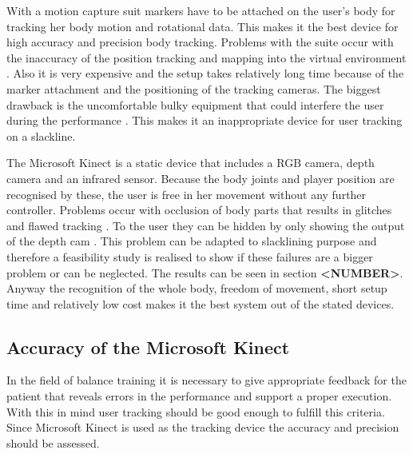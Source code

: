 With a motion capture suit markers have to be attached on the user’s body for tracking her body motion and rotational data. This makes it the best device for high accuracy and precision body tracking. Problems with the suite occur with the inaccuracy of the position tracking and mapping into the virtual environment \cite{Bogdanovych2015-ci} \cite{Nusman2006-rf}. Also it is very expensive and the setup takes relatively long time because of the marker attachment and the positioning of the tracking cameras. The biggest drawback is the uncomfortable bulky equipment that could interfere the user during the performance \cite{Chang2012-hz}. This makes it an inappropriate device for user tracking on a slackline.

The Microsoft Kinect is a static device that includes a RGB camera, depth camera and an infrared sensor. Because the body joints and player position are recognised by these, the user is free in her movement without any further controller. Problems occur with occlusion of body parts that results in glitches and flawed tracking \cite{Kajastila2014-ug} \cite{Tang2015-wt}. To the user they can be hidden by only showing the output of the depth cam \cite{Holsti2013-kn}. This problem can be adapted to slacklining purpose and therefore a feasibility study is realised to show if these failures are a bigger problem or can be neglected. The results can be seen in section \textbf{<NUMBER>}. Anyway the recognition of the whole body, freedom of movement, short setup time and relatively low cost makes it the best system out of the stated devices.

\subsection{Accuracy of the Microsoft Kinect}

In the field of balance training it is necessary to give appropriate feedback for the patient that reveals errors in the performance and support a proper execution. With this in mind user tracking should be good enough to fulfill this criteria. Since Microsoft Kinect is used as the tracking device the accuracy and precision should be assessed.

